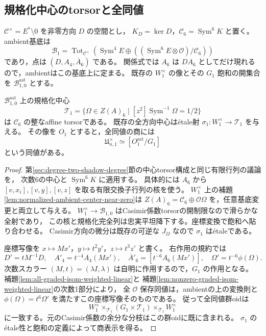 \subsection{規格化中心のtorsorと全同値}

$\mathcal C^\times=E^*\setminus0$ を非零方向 $D$ の空間とし，
$K_D=\ker D$，$\mathcal C_6=\operatorname{Sym}^6K$ と置く。
ambient基底は
\[
 \mathcal B_1=\operatorname{Tot}_{\mathcal C^\times}
 \left(\operatorname{Sym}^4E\oplus
          ((\operatorname{Sym}^6E\otimes\mathcal O)/\mathcal C_6)\right)
\]
であり，点は $(D,A_4,\overline A_6)$ である。
関係式では $A_6$ は $DA_6$ としてだけ現れるので，ambientはこの基底上に定まる。
既存の $W_1^\times$ の像とその $G_1$ 飽和の開集合を $\mathcal B_{1,0}^{\mathrm{sat}}$ とする。

\begin{lemma}[次数1の中心torsorによる表示]
\label{lem:degree-one-intrinsic-center-torsor}
$\mathcal B_{1,0}^{\mathrm{sat}}$ 上の規格化中心
\[
 \mathcal T_1=\{\Omega\in Z(A)_6\mid
       [z^2]\operatorname{Sym}^{-1}\Omega=1/2\}
\]
は $\mathcal C_6$ の整なaffine torsorである。
既存の全方向中心は\'{e}tale射 $\sigma_1:W_1^\times\to\mathcal T_1$ を与える。
その像を $O_1$ とすると，全同値の商には
\[
 \mathfrak U_{n,1}^\times\simeq[O_1^{\mathrm{sat}}/G_1]
\]
という同値がある。
\end{lemma}
\begin{proof}
第\ref{sec:degree-two-shadow-degree}節の中心torsor構成と同じ有限行列の議論を，
次数6の中心と $\operatorname{Sym}^6K$ に適用する。
具体的には $A_6$ から $[v,x_i],[v,y],[v,z]$ を取る有限交換子行列の核を使う。
$W_1^\times$ 上の補題\ref{lem:normalized-ambient-center-near-zero}は
$Z(A)_6=\mathcal C_6\oplus\mathcal O\Omega$ を，任意基底変更と両立して与える。
$W_1^\times\to\mathcal B_{1,0}$ はCasimir係数torsorの開制限なので滑らかな全射であり，
この核と規格化完全列は忠実平坦降下する。座標変換で飽和へ貼り合わせる。
Casimir方向の微分は既存の可逆な $J_\Omega$ なので $\sigma_1$ は\'{e}taleである。

座標写像を $x\mapsto Mx'$，$y\mapsto t^2y'$，$z\mapsto t^3z'$ と書く。
右作用の規約では
\[
 D'=tM^{-1}D,\quad A'_4=t^{-4}A_4(Mx'),\quad
 \overline A'_6=[t^{-6}A_6(Mx')],\quad
 \Omega'=t^{-6}\phi(\Omega).
\]
次数スカラー $(M,t)=(\lambda I,\lambda)$ は自明に作用するので，$G_1$ の作用となる。
補題\ref{lem:all-graded-isom-weighted-linear}と
補題\ref{lem:nonzero-graded-isom-weighted-linear}の次数1部分により，
全 $\mathcal O$ 保存同値は，ambientの上の変換則と
$\phi(\Omega)=t^6\Omega'$ を満たすこの座標写像そのものである。
従って全同値群oidは
\[
 W_1^\times\times_{\mathcal T_1}(G_1\times\mathcal T_1)
                           \times_{\mathcal T_1}W_1^\times
\]
に一致する。元のCasimir係数の余分な分枝はこの群oidに既に含まれる。
$\sigma_1$ の\'{e}tale性と飽和の定義によって商表示を得る。
\end{proof}

